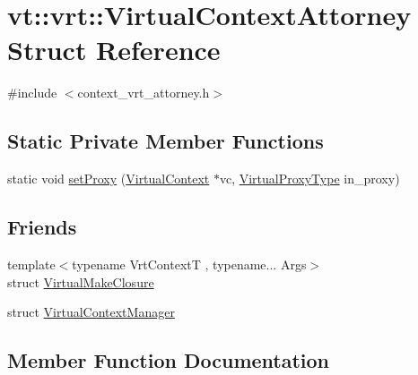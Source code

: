\hypertarget{structvt_1_1vrt_1_1_virtual_context_attorney}{}\section{vt\+:\+:vrt\+:\+:Virtual\+Context\+Attorney Struct Reference}
\label{structvt_1_1vrt_1_1_virtual_context_attorney}


{\ttfamily \#include $<$context\+\_\+vrt\+\_\+attorney.\+h$>$}

\subsection*{Static Private Member Functions}
\begin{DoxyCompactItemize}
\item 
static void \hyperlink{structvt_1_1vrt_1_1_virtual_context_attorney_a00bb2852c8d1b7159cea97d46c163241}{set\+Proxy} (\hyperlink{structvt_1_1vrt_1_1_virtual_context}{Virtual\+Context} $\ast$vc, \hyperlink{namespacevt_a1b417dd5d684f045bb58a0ede70045ac}{Virtual\+Proxy\+Type} in\+\_\+proxy)
\end{DoxyCompactItemize}
\subsection*{Friends}
\begin{DoxyCompactItemize}
\item 
{\footnotesize template$<$typename Vrt\+ContextT , typename... Args$>$ }\\struct \hyperlink{structvt_1_1vrt_1_1_virtual_context_attorney_a6d27b32cd35d056a4d8bf6ba43f28f62}{Virtual\+Make\+Closure}
\item 
struct \hyperlink{structvt_1_1vrt_1_1_virtual_context_attorney_a93a95e040b1875a105c62f3465731412}{Virtual\+Context\+Manager}
\end{DoxyCompactItemize}


\subsection{Member Function Documentation}
\mbox{\label{structvt_1_1vrt_1_1_virtual_context_attorney_a00bb2852c8d1b7159cea97d46c163241}} 
